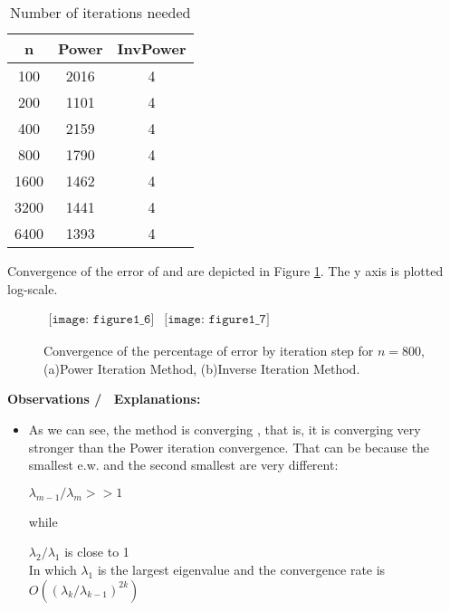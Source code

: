 {{\begin{table}[H]
    \centering
    \caption{Number of iterations needed}
    \begin{tabular}{c|c|c}
    n & Power & InvPower\\
    \hline
    \hline
    100  & 2016 & 4  \\
    200  & 1101 & 4  \\
    400  & 2159 & 4  \\
    800  & 1790 & 4  \\
    1600 & 1462 & 4  \\
    3200 & 1441 & 4  \\
    6400 & 1393 & 4  \\
    \end{tabular}
    \label{tab:1_1}
\end{table}


Convergence of the error of  and  are depicted in Figure \ref{fig:fig1_6}. The y axis is plotted log-scale.


\begin{figure}[H]
    \centering
    $\begin{array}{cc}
        \texttt{[image: figure1\_6]} &
        \texttt{[image: figure1\_7]}
    \end{array}$
    \caption{Convergence of the percentage of error by iteration step for $n=800$, (a)Power Iteration Method, (b)Inverse Iteration Method.}
    \label{fig:fig1_6}
\end{figure}

 {\LARGE \textbf{Observations \slash~  Explanations:}}

\begin{itemize}
    \item As we can see, the  method is converging , that is, it is converging very stronger than the Power iteration convergence. That can be because the smallest e.w. and the second smallest are very different:
        
        $\lambda_{m-1}\slash\lambda_{m} >>1$
        
        while
        
        $\lambda_2 \slash \lambda_1 $ is close to 1 \\
        In which $\lambda_1 $ is the largest eigenvalue
        and the convergence rate is $O((\lambda_{k} \slash \lambda_{k-1})^{2k}) $
        
        

\end{itemize}}}
